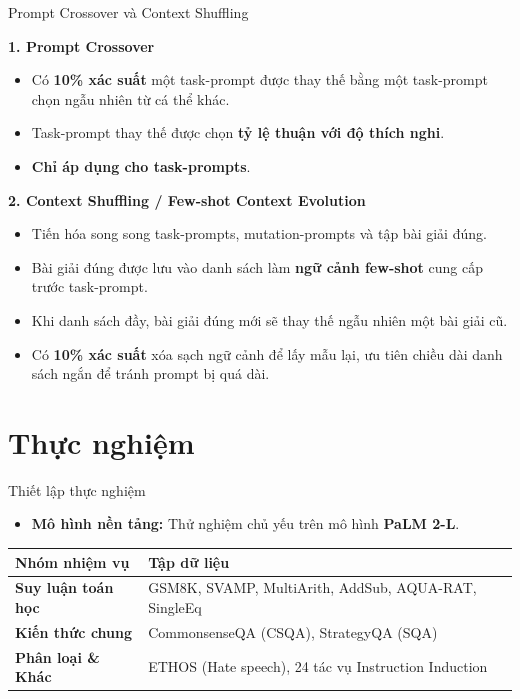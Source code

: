 \documentclass[english,main=vietnamese,xcolor=table]{beamer}
\begin{document}
\begin{frame}{Prompt Crossover và Context Shuffling}

\textbf{1. Prompt Crossover}
\begin{itemize}
    \item Có \textbf{10\% xác suất} một task-prompt được thay thế bằng một task-prompt chọn ngẫu nhiên từ cá thể khác.
    \item Task-prompt thay thế được chọn \textbf{tỷ lệ thuận với độ thích nghi}.
    \item \textbf{Chỉ áp dụng cho task-prompts}.
\end{itemize}

\vspace{0.5em}
\textbf{2. Context Shuffling / Few-shot Context Evolution}
\begin{itemize}
    \item Tiến hóa song song task-prompts, mutation-prompts và tập bài giải đúng.
    \item Bài giải đúng được lưu vào danh sách làm \textbf{ngữ cảnh few-shot} cung cấp trước task-prompt.
    \item Khi danh sách đầy, bài giải đúng mới sẽ thay thế ngẫu nhiên một bài giải cũ.
    \item Có \textbf{10\% xác suất} xóa sạch ngữ cảnh để lấy mẫu lại, ưu tiên chiều dài danh sách ngắn để tránh prompt bị quá dài.
\end{itemize}

\end{frame}

\section{Thực nghiệm}

\begin{frame}{Thiết lập thực nghiệm}
\begin{itemize}
    \item \textbf{Mô hình nền tảng:} Thử nghiệm chủ yếu trên mô hình \textbf{PaLM 2-L}.
\end{itemize}

\vspace{0.3cm}

    \centering
    \small
    \renewcommand{\arraystretch}{1.4} %
    \begin{tabular}{|l|p{7cm}|}
    \hline
    \rowcolor{blue!20} \textbf{Nhóm nhiệm vụ} & \textbf{Tập dữ liệu} \\ \hline
    \textbf{Suy luận toán học} & GSM8K, SVAMP, MultiArith, AddSub, AQUA-RAT, SingleEq \\ \hline
    \textbf{Kiến thức chung} & CommonsenseQA (CSQA), StrategyQA (SQA) \\ \hline
    \textbf{Phân loại \& Khác} & ETHOS (Hate speech), 24 tác vụ Instruction Induction \\ \hline
    \end{tabular}
\end{frame}
\end{document}
